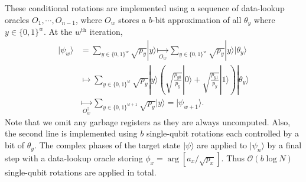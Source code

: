\documentclass[a4paper,onecolumn,10pt,accepted=2024-05-22]{quantumarticle}
\newcommand{\ket}[1]{| #1\rangle}        %
\newcommand{\op}[1]{\operatorname{#1}}
\begin{document}
	These conditional rotations are implemented using a sequence of data-lookup oracles $O_1,\cdots, O_{n-1}$, where $O_w$ stores a $b$-bit approximation of all $\theta_y$ where $y\in\{0,1\}^w$. At the $w^{\mathrm{th}}$ iteration, 
	\begin{align}\nonumber
	\ket{\psi_w}&=\sum_{y\in\{0,1\}^w}\sqrt{p_y}\ket{y}
	\underset{O_w}{\mapsto}
	\sum_{y\in\{0,1\}^w}\sqrt{p_y}\ket{y}\ket{\theta_y}
	\\\nonumber
	&\mapsto
	\sum_{y\in\{0,1\}^w}\sqrt{p_y}\ket{y}\left(\sqrt{\frac{p_{y0}}{p_y}}\ket{0}+\sqrt{\frac{p_{y1}}{p_y}}\ket{1}\right)\ket{\theta_y}
	\\%
	&\underset{O^\dag_w}{\mapsto}
	\sum_{y\in\{0,1\}^{w+1}}\sqrt{p_y}\ket{y} 
	= \ket{\psi_{w+1}}.
	\end{align} 
	Note that we omit any garbage registers as they are always uncomputed. Also, the second line is implemented using $b$ single-qubit rotations each controlled by a bit of $\theta_y$. The complex phases of the target state $\ket{\psi}$ are applied to $\ket{\psi_n}$ by a final step with a data-lookup oracle storing $\phi_x=\op{arg}{[a_x/\sqrt{p_x}]}$. Thus $\mathcal{O}(b\log{N})$ single-qubit rotations are applied in total. 
	
\end{document}
